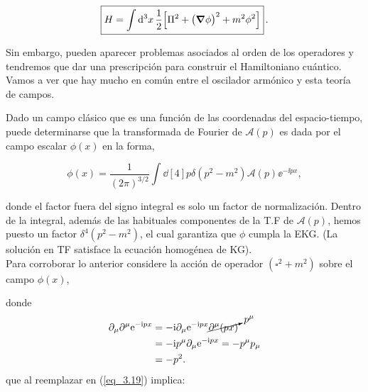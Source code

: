 \begin{equation}
	\boxed{
    H = \int \dd[3]{x} \frac{1}{2}\qty[\Pi^2+\qty\big(\grad \phi)^2+m^2\phi^2]} \, .
    \label{eq_3.17}
\end{equation}

Sin embargo, pueden aparecer problemas asociados al orden de los operadores y tendremos que dar una prescripción para construir el Hamiltoniano cuántico. Vamos a ver que hay mucho en común entre el oscilador armónico y esta teoría de campos.\\ 

\newcommand{\CA}{\mathcal{A}} %
\newcommand{\OCA}{\mathcal{A}}

Dado un campo clásico que es una función de las coordenadas del espacio-tiempo, puede determinarse que la transformada de Fourier de $\CA(p)$ es dada por el campo escalar $\phi(x)$ en la forma, 

\begin{equation}
    \phi \left( x\right) =\frac{1}{(2\pi)^{3/2}}\int \dd[4]{p} \delta (p^{2}-m^{2}) \CA \left(p\right) \ee^{-\ii px}, 
    \label{eq_3.18}
\end{equation}

donde el factor fuera del signo integral es solo un factor de normalización. Dentro de la integral, además de las habituales componentes de la T.F de $\CA(p)$, hemos puesto un factor $\delta^4(p^{2}-m^{2})$, el cual garantiza que $\phi$ cumpla la EKG. (La solución en TF satisface la ecuación homogénea de KG).\\

Para corroborar lo anterior considere la acción de operador $(\square^{2}+m^{2})$ sobre el campo $\phi(x)$,

donde 
\begin{equation*}
    \begin{split}
        \partial_\mu \partial^\mu \mathrm{e}^{-\mathrm{i} px} &= - \mathrm{i} \partial_\mu \mathrm{e}^{-\mathrm{i} px} \cancelto{p^\mu}{\partial^\mu(px)}\\
        & = -\mathrm{i} p^\mu \partial_\mu \mathrm{e}^{-\mathrm{i} px} = -p^\mu p_\mu \\
        & = - p^2.
    \end{split} 
\end{equation*}
que al reemplazar en (\ref{eq_3.19}) implica:

